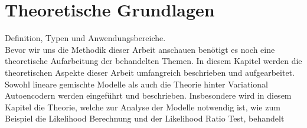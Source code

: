 \documentclass[%
thesis=student,%
coverpage=false,%
titlepage=false,%
headmarks=true, %
german,%
font=libertine, %
math=newpxtx, %
BCOR=5mm,%
coverBCOR=11mm%
]{tumbook}
\theoremstyle{break}
\begin{document}
\chapter{Theoretische Grundlagen}
Definition, Typen und Anwendungsbereiche.\\
Bevor wir uns die Methodik dieser Arbeit anschauen benötigt es noch eine theoretische Aufarbeitung der behandelten Themen. In diesem Kapitel werden die theoretischen Aspekte dieser Arbeit umfangreich beschrieben und aufgearbeitet. Sowohl lineare gemischte Modelle als auch die Theorie hinter Variational Autoencodern werden eingeführt und beschrieben. Insbesondere wird in diesem Kapitel die Theorie, welche zur Analyse der Modelle notwendig ist, wie zum Beispiel die Likelihood Berechnung und der Likelihood Ratio Test, behandelt
\end{document}
